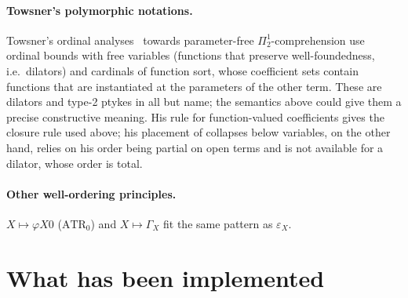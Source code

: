 \documentclass[11pt]{article}
\theoremstyle{definition}
\theoremstyle{remark}
\begin{document}
\paragraph{Towsner's polymorphic notations.} Towsner's ordinal
analyses~\cite{TowPMP,TowHalf,TowPoly} towards parameter-free
$\Pi^1_2$-comprehension use ordinal bounds with free
variables (functions that preserve well-foundedness, i.e.\ dilators) and
cardinals of function sort, whose coefficient sets contain functions that
are instantiated at the parameters of the other term. These are dilators
and type-2 ptykes in all but name; the semantics above could give them a
precise constructive meaning. His rule for function-valued coefficients
gives the closure rule used above; his placement of collapses below
variables, on the other hand, relies on his order being partial on open
terms and is not available for a dilator, whose order is total.

\paragraph{Other well-ordering principles.} $X\mapsto\varphi X0$
($\mathrm{ATR}_0$) and $X\mapsto\Gamma_X$ fit the same pattern as
$\varepsilon_X$.

\section{What has been implemented}
\end{document}

